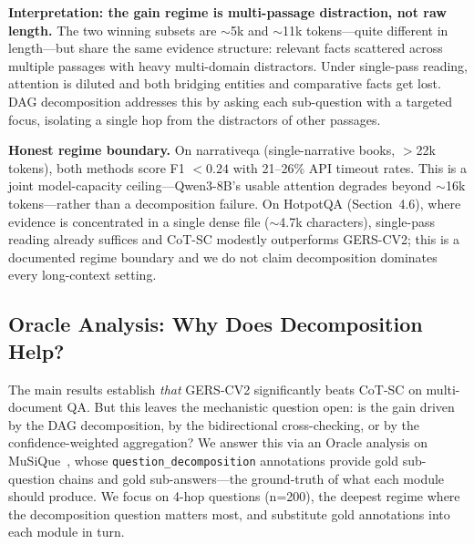 \documentclass[11pt,a4paper]{article}
\begin{document}
\textbf{Interpretation: the gain regime is multi-passage distraction, not raw length.} The two winning subsets are ${\sim}$5k and ${\sim}$11k tokens---quite different in length---but share the same evidence structure: relevant facts scattered across multiple passages with heavy multi-domain distractors. Under single-pass reading, attention is diluted and both bridging entities and comparative facts get lost. DAG decomposition addresses this by asking each sub-question with a targeted focus, isolating a single hop from the distractors of other passages.

\textbf{Honest regime boundary.} On narrativeqa (single-narrative books, ${>}$22k tokens), both methods score F1 ${<}0.24$ with 21--26\% API timeout rates. This is a joint model-capacity ceiling---Qwen3-8B's usable attention degrades beyond ${\sim}$16k tokens---rather than a decomposition failure. On HotpotQA (Section~4.6), where evidence is concentrated in a single dense file (${\sim}$4.7k characters), single-pass reading already suffices and CoT-SC modestly outperforms GERS-CV2; this is a documented regime boundary and we do not claim decomposition dominates every long-context setting.

\subsection{Oracle Analysis: Why Does Decomposition Help?}

The main results establish \emph{that} GERS-CV2 significantly beats CoT-SC on multi-document QA. But this leaves the mechanistic question open: is the gain driven by the DAG decomposition, by the bidirectional cross-checking, or by the confidence-weighted aggregation? We answer this via an Oracle analysis on MuSiQue~\cite{trivedi2022musique}, whose \texttt{question\_decomposition} annotations provide gold sub-question chains and gold sub-answers---the ground-truth of what each module should produce. We focus on 4-hop questions (n=200), the deepest regime where the decomposition question matters most, and substitute gold annotations into each module in turn.

\begin{table}[h]
\centering
\caption{Oracle waterfall on MuSiQue 4-hop (n=200, Qwen3-8B, full context). We substitute gold annotations for each module and measure the recovered F1. All comparisons are paired.}
\label{tab:oracle}
\end{table}
\end{document}
